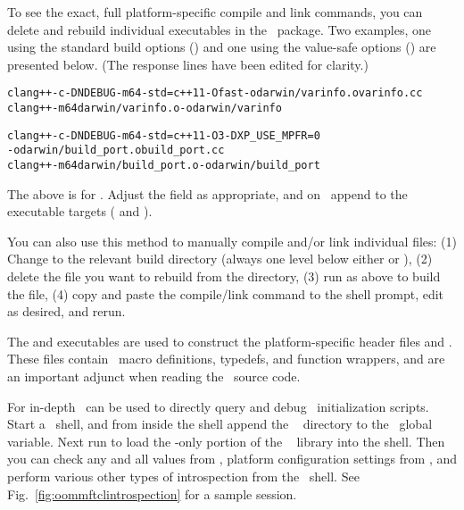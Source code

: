 To see the exact, full platform-specific compile and link commands, you
can delete and rebuild individual executables in the
\OOMMF\ package. Two examples, one using the standard build options
() and one using the value-safe options
() are presented below. (The response
lines have been edited for clarity.)
\begin{alltt}
% \shellcmd{cd pkg/oc}
% \shellcmd{tclsh ../../oommf.tcl pimake clean}
% \shellcmd{tclsh ../../oommf.tcl pimake darwin/varinfo}
clang++ -c -DNDEBUG -m64 -std=c++11 -Ofast -o darwin/varinfo.o varinfo.cc
clang++ -m64 darwin/varinfo.o -o darwin/varinfo

% \shellcmd{cd ../..}
% \shellcmd{cd pkg/xp}
% \shellcmd{tclsh ../../oommf.tcl pimake clean}
% \shellcmd{tclsh ../../oommf.tcl pimake darwin/build_port}
clang++ -c -DNDEBUG -m64 -std=c++11 -O3 -DXP_USE_MPFR=0
   -o darwin/build_port.o build_port.cc
clang++ -m64 darwin/build_port.o -o darwin/build_port
\end{alltt}\html{\newline}
The above is for \MacOSX. Adjust the  field as appropriate,
and on \Windows\ append  to the executable targets (
and ).

You can also use this method to manually compile and/or link individual
files: (1) Change to the relevant build directory (always one level below
either  or ), (2) delete the file you want to rebuild from
the  directory, (3) run  as above to build the
file, (4) copy and paste the compile/link command to the shell prompt,
edit as desired, and rerun.

The  and  executables are
used to construct the platform-specific header files
 and
. These files contain
\Cplusplus\ macro definitions, typedefs, and function wrappers,
and are an important adjunct when reading the \OOMMF\ source code.


For in-depth  \Tcl\ can be
used to directly query and debug \OOMMF\ initialization scripts. Start a
\Tcl\ shell, and from inside the shell append the \OOMMF\ 
directory to the \Tcl\ global  variable. Next run
 to load the \Tcl-only portion of the
\OOMMF\  library into the shell. Then you can check any and all
 values from , platform
configuration settings from , and
perform various other types of introspection from the \Tcl\ shell. See
Fig.~\ref{fig:oommftclintrospection} for a sample session.

